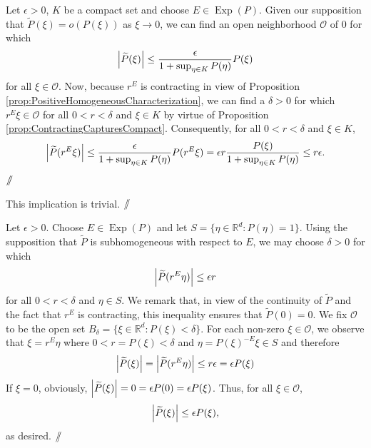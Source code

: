 \documentclass[smallextended]{svjour3}
\theoremstyle{remark}
\renewcommand*{\qedsymbol}{\hfill$\mathbin{/\mkern-6mu/}$}
\renewenvironment{subproof}[1][\proofname]{\renewcommand\xsubproofname{#1}\xsubproof}{\endxsubproof}
\renewenvironment{proof}[1][\proofname]{\renewcommand\xproofname{#1}\xproof}{\endxproof}
\newcommand\Exp{\operatorname{Exp}}
\begin{document}
\begin{proof}
\begin{subproof}[\ref{item:Subhomequivtolittleoh1} $\Rightarrow$ \ref{item:Subhomequivtolittleoh2}] Let $\epsilon>0$, $K$ be a compact set and choose $E\in \Exp(P)$. Given our supposition that $\widetilde{P}(\xi)=o(P(\xi))$ as $\xi\to 0$, we can find an open neighborhood $\mathcal{O}$ of $0$ for which 
\begin{equation*}
\abs{\widetilde{P}(\xi)}\leq \frac{\epsilon}{1+\sup_{\eta\in K}P(\eta)}P(\xi)
\end{equation*}
for all $\xi\in \mathcal{O}$. Now, because $r^E$ is contracting in view of Proposition \ref{prop:PositiveHomogeneousCharacterization}, we can find a $\delta>0$ for which $r^E\xi\in \mathcal{O}$ for all $0<r<\delta$ and $\xi\in K$ by virtue of Proposition \ref{prop:ContractingCapturesCompact}. Consequently, for all $0<r<\delta$ and $\xi\in K$,
\begin{equation*}
\abs{\widetilde{P}(r^E\xi)}\leq \frac{\epsilon}{1+\sup_{\eta\in K}P(\eta)}P(r^E\xi)=\epsilon r\frac{P(\xi)}{1+\sup_{\eta\in K}P(\eta)}\leq r\epsilon.
\end{equation*}\qedsymbol
\end{subproof}

\begin{subproof}[\ref{item:Subhomequivtolittleoh2} $\Rightarrow$ \ref{item:Subhomequivtolittleoh3}] This implication is trivial. \qedsymbol
\end{subproof}
 
 \begin{subproof}[\ref{item:Subhomequivtolittleoh3} $\Rightarrow$ \ref{item:Subhomequivtolittleoh1}]  Let $\epsilon>0$. Choose $E\in \Exp(P)$ and let $S=\{\eta\in\mathbb{R}^d:P(\eta)=1\}$. Using the supposition that $\widetilde{P}$ is subhomogeneous with respect to $E$, we may choose $\delta>0$ for which
\begin{equation*}
\abs{\widetilde{P}(r^E\eta)}\leq \epsilon r 
\end{equation*}
 for all $0<r<\delta$ and $\eta\in S$. We remark that, in view of the continuity of $\widetilde{P}$ and the fact that $r^E$ is contracting, this inequality ensures that $\widetilde{P}(0)=0$. We fix $\mathcal{O}$ to be the open set $B_\delta=\{\xi\in\mathbb{R}^d:P(\xi)<\delta\}$. For each non-zero $\xi\in\mathcal{O}$, we observe that $\xi=r^E\eta$ where $0<r=P(\xi)<\delta$ and $\eta=P(\xi)^{-E}\xi\in S$ and therefore
\begin{equation*}
\abs{\widetilde{P}(\xi)}=\abs{\widetilde{P}(r^E\eta)}\leq r\epsilon=\epsilon  P(\xi)
\end{equation*}
If $\xi=0$, obviously, $\abs{\widetilde{P}(\xi)}=0=\epsilon P(0)=\epsilon P(\xi)$. Thus, for all $\xi\in\mathcal{O}$,
\begin{equation*}
\abs{\widetilde{P}(\xi)}\leq\epsilon P(\xi),
\end{equation*}
as desired. \qedsymbol
\end{subproof}
\end{proof}
\end{document}
